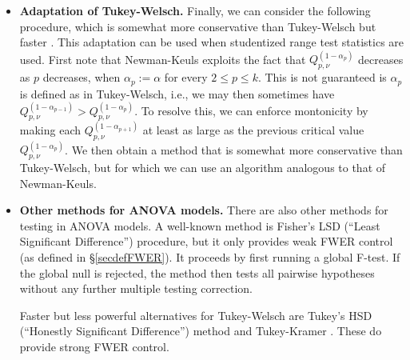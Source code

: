 \documentclass[11pt]{article}
\theoremstyle{plain}
\theoremstyle{definition}
\newcommand{\citp}{\citep}
\begin{document}
\begin{itemize}
\item
\textbf{Adaptation of Tukey-Welsch.}
Finally, we can consider the following procedure, which is somewhat more conservative than Tukey-Welsch but faster \citp[][p.115]{hochberg1987multiple}. This adaptation can be used when studentized range test statistics are used.
First note that Newman-Keuls exploits the fact that $Q_{p,\nu}^{(1-\alpha_p)}$ decreases as $p$ decreases, when $\alpha_p:=\alpha$ for every $2\leq p \leq k$. This is not guaranteed is $\alpha_p$ is defined as in Tukey-Welsch, i.e., we may then sometimes have $Q_{p,\nu}^{(1-\alpha_{p-1})} > Q_{p,\nu}^{(1-\alpha_p)}$. To resolve this, we can enforce montonicity by making each  $Q_{p,\nu}^{(1-\alpha_{p+1})}$ at least as large as the previous critical value  $Q_{p,\nu}^{(1-\alpha_{p})}$. We then obtain a method that is somewhat more conservative than Tukey-Welsch, but for which we can use an algorithm analogous to that of Newman-Keuls.

\item
\textbf{Other methods for ANOVA models.}
There are also other methods for testing in ANOVA models.
A well-known method is Fisher's LSD (``Least Significant Difference'') procedure, but it only provides weak FWER control (as defined in \S\ref{secdefFWER}). It proceeds by first running a global F-test. If the global null is rejected, the method then tests all pairwise hypotheses without any further multiple testing correction.

Faster but less powerful alternatives for Tukey-Welsch are Tukey's HSD (``Honestly Significant Difference'') method and  Tukey-Kramer \citp{fay2022statistical}. These do provide strong FWER control.

\end{itemize}
\end{document}
